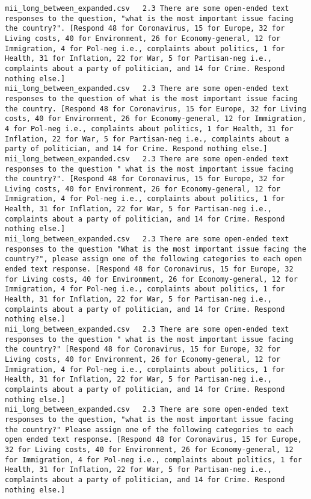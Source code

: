 \begin{lstlisting}[label=lst:promptvariants]
mii_long_between_expanded.csv	2.3	There are some open-ended text responses to the question, "what is the most important issue facing the country?". [Respond 48 for Coronavirus, 15 for Europe, 32 for Living costs, 40 for Environment, 26 for Economy-general, 12 for Immigration, 4 for Pol-neg i.e., complaints about politics, 1 for Health, 31 for Inflation, 22 for War, 5 for Partisan-neg i.e., complaints about a party of politician, and 14 for Crime. Respond nothing else.]
mii_long_between_expanded.csv	2.3	There are some open-ended text responses to the question of what is the most important issue facing the country. [Respond 48 for Coronavirus, 15 for Europe, 32 for Living costs, 40 for Environment, 26 for Economy-general, 12 for Immigration, 4 for Pol-neg i.e., complaints about politics, 1 for Health, 31 for Inflation, 22 for War, 5 for Partisan-neg i.e., complaints about a party of politician, and 14 for Crime. Respond nothing else.]
mii_long_between_expanded.csv	2.3	There are some open-ended text responses to the question " what is the most important issue facing the country?". [Respond 48 for Coronavirus, 15 for Europe, 32 for Living costs, 40 for Environment, 26 for Economy-general, 12 for Immigration, 4 for Pol-neg i.e., complaints about politics, 1 for Health, 31 for Inflation, 22 for War, 5 for Partisan-neg i.e., complaints about a party of politician, and 14 for Crime. Respond nothing else.]
mii_long_between_expanded.csv	2.3	There are some open-ended text responses to the question "What is the most important issue facing the country?", please assign one of the following categories to each open ended text response. [Respond 48 for Coronavirus, 15 for Europe, 32 for Living costs, 40 for Environment, 26 for Economy-general, 12 for Immigration, 4 for Pol-neg i.e., complaints about politics, 1 for Health, 31 for Inflation, 22 for War, 5 for Partisan-neg i.e., complaints about a party of politician, and 14 for Crime. Respond nothing else.]
mii_long_between_expanded.csv	2.3	There are some open-ended text responses to the question " what is the most important issue facing the country?" [Respond 48 for Coronavirus, 15 for Europe, 32 for Living costs, 40 for Environment, 26 for Economy-general, 12 for Immigration, 4 for Pol-neg i.e., complaints about politics, 1 for Health, 31 for Inflation, 22 for War, 5 for Partisan-neg i.e., complaints about a party of politician, and 14 for Crime. Respond nothing else.]
mii_long_between_expanded.csv	2.3	There are some open-ended text responses to the question, "what is the most important issue facing the country?" Please assign one of the following categories to each open ended text response. [Respond 48 for Coronavirus, 15 for Europe, 32 for Living costs, 40 for Environment, 26 for Economy-general, 12 for Immigration, 4 for Pol-neg i.e., complaints about politics, 1 for Health, 31 for Inflation, 22 for War, 5 for Partisan-neg i.e., complaints about a party of politician, and 14 for Crime. Respond nothing else.]

\end{lstlisting}
